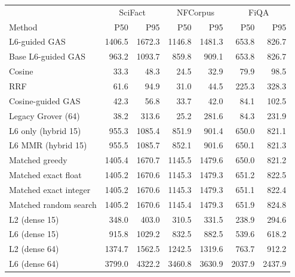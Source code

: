 \begin{tabular}{lrrrrrr}
\toprule
& \multicolumn{2}{c}{SciFact} & \multicolumn{2}{c}{NFCorpus} & \multicolumn{2}{c}{FiQA}\\
Method & P50 & P95 & P50 & P95 & P50 & P95\\
\midrule
L6-guided GAS & 1406.5 & 1672.3 & 1146.8 & 1481.3 & 653.8 & 826.7\\
Base L6-guided GAS & 963.2 & 1093.7 & 859.8 & 909.1 & 653.8 & 826.7\\
Cosine & 33.3 & 48.3 & 24.5 & 32.9 & 79.9 & 98.5\\
RRF & 61.6 & 94.9 & 31.0 & 44.5 & 225.3 & 328.3\\
Cosine-guided GAS & 42.3 & 56.8 & 33.7 & 42.0 & 84.1 & 102.5\\
Legacy Grover (64) & 38.2 & 313.6 & 25.2 & 281.6 & 84.3 & 231.9\\
L6 only (hybrid 15) & 955.3 & 1085.4 & 851.9 & 901.4 & 650.0 & 821.1\\
L6 MMR (hybrid 15) & 955.5 & 1085.7 & 852.1 & 901.6 & 650.1 & 821.3\\
Matched greedy & 1405.4 & 1670.7 & 1145.5 & 1479.6 & 650.0 & 821.2\\
Matched exact float & 1405.2 & 1670.6 & 1145.3 & 1479.3 & 651.2 & 822.5\\
Matched exact integer & 1405.2 & 1670.6 & 1145.3 & 1479.3 & 651.1 & 822.4\\
Matched random search & 1405.2 & 1670.6 & 1145.4 & 1479.3 & 651.9 & 824.8\\
L2 (dense 15) & 348.0 & 403.0 & 310.5 & 331.5 & 238.9 & 294.6\\
L6 (dense 15) & 915.8 & 1029.2 & 832.5 & 882.5 & 539.6 & 618.2\\
L2 (dense 64) & 1374.7 & 1562.5 & 1242.5 & 1319.6 & 763.7 & 912.2\\
L6 (dense 64) & 3799.0 & 4322.2 & 3460.8 & 3630.9 & 2037.9 & 2437.9\\
\bottomrule
\end{tabular}
